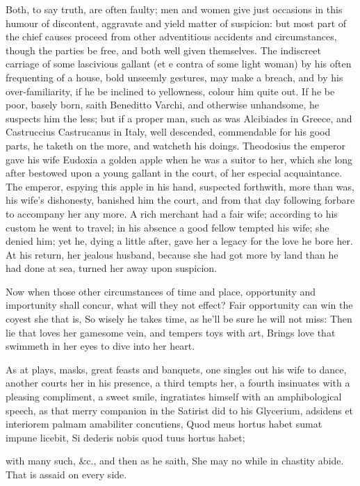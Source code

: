 {Both, to say truth, are often faulty; men and women give just occasions
in this humour of discontent, aggravate and yield matter of suspicion:
but most part of the chief causes proceed from other adventitious
accidents and circumstances, though the parties be free, and both well
given themselves. The indiscreet carriage of some lascivious gallant
(et e contra of some light woman) by his often frequenting of a house,
bold unseemly gestures, may make a breach, and by his over-familiarity,
if he be inclined to yellowness, colour him quite out. If he be poor,
basely born, saith Beneditto Varchi, and otherwise unhandsome, he
suspects him the less; but if a proper man, such as was Alcibiades in
Greece, and Castruccius Castrucanus in Italy, well descended,
commendable for his good parts, he taketh on the more, and watcheth his
doings. Theodosius the emperor gave his wife Eudoxia a golden
apple when he was a suitor to her, which she long after bestowed upon a
young gallant in the court, of her especial acquaintance. The emperor,
espying this apple in his hand, suspected forthwith, more than was, his
wife's dishonesty, banished him the court, and from that day following
forbare to accompany her any more. A rich merchant had a fair
wife; according to his custom he went to travel; in his absence a good
fellow tempted his wife; she denied him; yet he, dying a little after,
gave her a legacy for the love he bore her. At his return, her jealous
husband, because she had got more by land than he had done at sea,
turned her away upon suspicion.

Now when those other circumstances of time and place, opportunity and
importunity shall concur, what will they not effect?
Fair opportunity can win the coyest she that is,
So wisely he takes time, as he'll be sure he will not miss:
Then lie that loves her gamesome vein, and tempers toys with art,
Brings love that swimmeth in her eyes to dive into her heart.

As at plays, masks, great feasts and banquets, one singles out his wife
to dance, another courts her in his presence, a third tempts her, a
fourth insinuates with a pleasing compliment, a sweet smile,
ingratiates himself with an amphibological speech, as that merry
companion in the  Satirist did to his Glycerium, adsidens
et interiorem palmam amabiliter concutiens,
Quod meus hortus habet sumat impune licebit,
Si dederis nobis quod tuus hortus habet;

with many such, \&c., and then as he saith,
She may no while in chastity abide.
That is assaid on every side.

}
